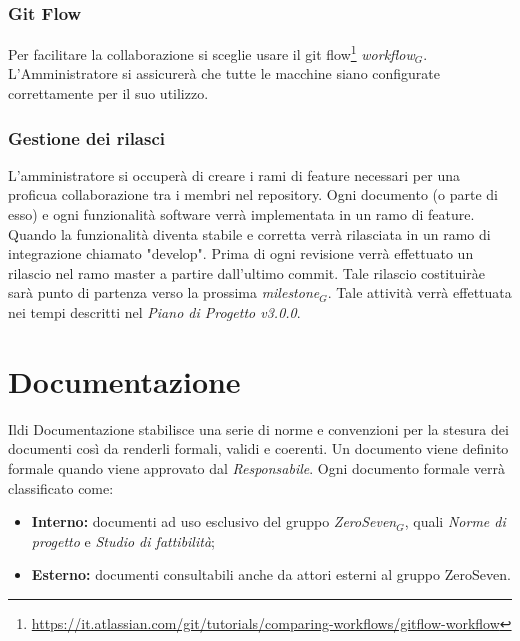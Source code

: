 \subsubsection{Git Flow}
Per facilitare la collaborazione si sceglie usare il git flow\footnote{\url{https://it.atlassian.com/git/tutorials/comparing-workflows/gitflow-workflow}} \textit{workflow$_{G}$}. L'Amministratore si assicurerà che tutte le macchine siano configurate correttamente per il suo utilizzo.
\subsubsection{Gestione dei rilasci}
L'amministratore si occuperà di creare i rami di feature necessari per una proficua collaborazione tra i membri nel repository. Ogni documento (o parte di esso) e ogni funzionalità software verrà implementata in un ramo di feature. Quando la funzionalità diventa stabile e corretta verrà rilasciata in un ramo di integrazione chiamato "develop". Prima di ogni revisione verrà effettuato un rilascio nel ramo master a partire dall'ultimo commit. Tale rilascio costituiràe sarà punto di partenza verso la prossima \textit{milestone$_{G}$}. Tale attività verrà effettuata nei tempi descritti nel \textit{Piano di Progetto v3.0.0}. 

\section{Documentazione}
Ildi Documentazione stabilisce una serie di norme e convenzioni per la stesura dei documenti così da renderli formali, validi e coerenti.
Un documento viene definito formale quando viene approvato dal \textit{Responsabile}.
Ogni documento formale verrà classificato come:
\begin{itemize}
	\item \textbf{Interno:} documenti ad uso esclusivo del gruppo \textit{ZeroSeven$_{G}$}, quali \textit{Norme di progetto} e \textit{Studio di fattibilità};
	\item \textbf{Esterno:} documenti consultabili anche da attori esterni al gruppo ZeroSeven.
	
\end{itemize}

